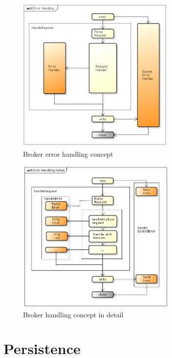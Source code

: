 \begin{figure}[H]
    \centering
    \includegraphics[width=0.7\textwidth]{images/broker-error-activity.png}
    \caption{Broker error handling concept}
    \label{fig:broker-error-activity.png}
\end{figure}


\begin{figure}[H]
    \centering
    \includegraphics[width=0.7\textwidth]{images/broker-error-activity-detail.png}
    \caption{Broker handling concept in detail}
    \label{fig:broker-error-activity-detail.png}
\end{figure}


\section{Persistence}

